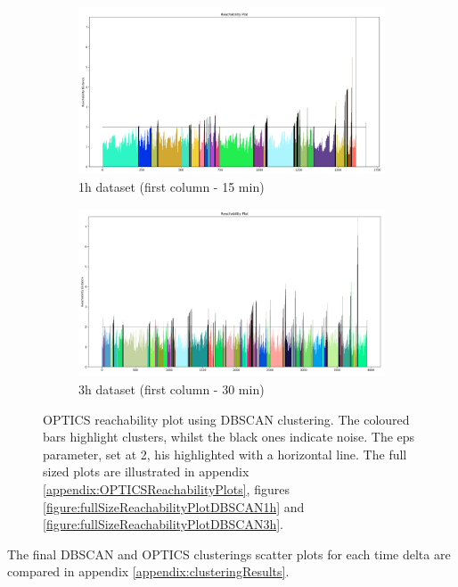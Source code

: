 \begin{figure}[H]
  \centering
  \begin{subfigure}{.5\textwidth}\captionsetup{width=.8\linewidth}
    \centering
    \includegraphics[width=1\textwidth]{./images/OPTICS/1h-1-reachabilityPlot-DBSCAN.png}
  \caption{1h dataset (first column - 15 min)}
  \end{subfigure}%
  \hfill
  \begin{subfigure}{.5\textwidth}\captionsetup{width=.8\linewidth}
    \centering
    \includegraphics[width=1\textwidth]{./images/OPTICS/3h-1-reachabilityPlot-DBSCAN.png}
    \caption{3h dataset (first column - 30 min)}
  \end{subfigure}
  \caption{OPTICS reachability plot using DBSCAN clustering. The coloured bars highlight clusters, whilst the black ones indicate noise. The eps parameter, set at 2, his highlighted with a horizontal line. The full sized plots are illustrated in appendix \ref{appendix:OPTICSReachabilityPlots}, figures \ref{figure:fullSizeReachabilityPlotDBSCAN1h} and \ref{figure:fullSizeReachabilityPlotDBSCAN3h}.}
  \label{figure:OPTICSResultsReachabilityPlot}
  \end{figure}


The final DBSCAN and OPTICS clusterings scatter plots for each time delta are compared in appendix \ref{appendix:clusteringResults}.
